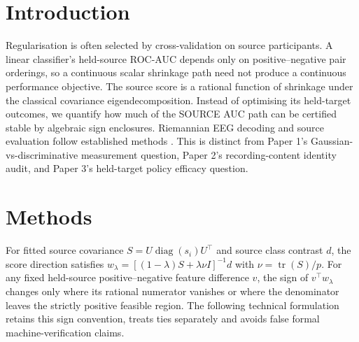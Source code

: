 \documentclass[11pt,a4paper]{article}
\begin{document}
\section{Introduction}
Regularisation is often selected by
cross-validation on source participants.
A linear classifier's held-source
ROC-AUC depends only on positive--negative
pair orderings, so a continuous scalar
shrinkage path need not produce a
continuous performance objective.
The source score is a rational function
of shrinkage under the classical
covariance eigendecomposition. Instead of
optimising its held-target outcomes,
we quantify how much of the
SOURCE AUC path can be certified
stable by algebraic sign enclosures.
Riemannian EEG decoding and source
evaluation follow established methods
\cite{barachant2012,jayaram2018moabb}.
This is distinct from Paper 1's
Gaussian-vs-discriminative measurement
question, Paper 2's recording-content
identity audit, and Paper 3's
held-target policy efficacy question.

\section{Methods}
For fitted source covariance
$S=U\operatorname{diag}(s_i)U^\top$
and source class contrast $d$,
the score direction satisfies
$w_\lambda=[(1-\lambda)S+
\lambda\nu I]^{-1}d$ with
$\nu=\operatorname{tr}(S)/p$.
For any fixed held-source
positive--negative feature difference $v$,
the sign of $v^\top w_\lambda$
changes only where its
rational numerator vanishes or
where the denominator leaves the
strictly positive feasible region.
The following technical formulation
retains this sign convention, treats ties
separately and avoids false formal
machine-verification claims.














\end{document}

